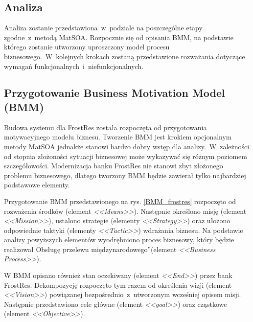 \subsection{Analiza}
Analiza zostanie przedstawiona~w~podziale na poszczególne etapy zgodne~z~metodą MatSOA. Rozpocznie się od opisania BMM, na podstawie którego zostanie utworzony uproszczony model procesu biznesowego.~W~kolejnych krokach zostaną przedstawione rozważania dotyczące wymagań funkcjonalnych~i~niefunkcjonalnych.

\subsection*{Przygotowanie Business Motivation Model (BMM)}
Budowa systemu dla FrostRes została rozpoczęta od przygotowania motywacyjnego modelu biznesu. Tworzenie BMM jest krokiem opcjonalnym metody MatSOA jednakże stanowi bardzo dobry wstęp dla analizy.~W~zależności od stopnia złożoności sytuacji biznesowej może wykazywać się różnym poziomem szczegółowości. Modernizacja banku FrostRes nie stanowi zbyt złożonego problemu biznesowego, dlatego tworzony BMM będzie zawierał tylko najbardziej podstawowe elementy.

Przygotowanie BMM przedstawionego na rys. \ref{BMM_frostres} rozpoczęto od rozważenia środków (element \emph{<<Means>>}). Następnie określono misję (element \emph{<<Mission>>}), ustalono strategie (elementy \emph{<<Strategy>>}) oraz ułożono odpowiednie taktyki (elementy \emph{<<Tactic>>}) wdrażania biznesu. Na podstawie analizy powyższych elementów wyodrębniono proces biznesowy, który będzie realizował \quotedblbase Obsługę przelewu międzynarodowego\textquotedblright (element \emph{<<Business Process>>}). 

W BMM opisano również stan oczekiwany (element \emph{<<End>>}) przez bank FrostRes. Dekompozycję rozpoczęto tym razem od określenia wizji (element \emph{<<Vision>>}) powiązanej bezpośrednio~z~utworzonym wcześniej opisem misji. Następnie przedstawiono cele główne (element \emph{<<goal>>}) oraz cząstkowe (element \emph{<<Objective>>}).

